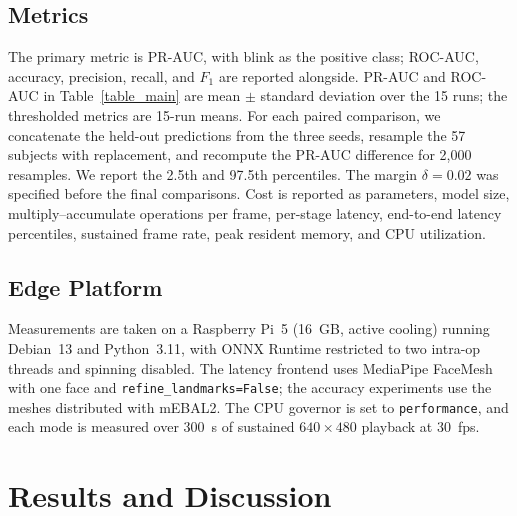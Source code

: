 \documentclass{IEEE_lsens}
\begin{document}
\subsection{Metrics}
The primary metric is PR-AUC, with blink as the positive class;
ROC-AUC, accuracy, precision, recall, and $F_1$ are reported alongside.
PR-AUC and ROC-AUC in Table~\ref{table_main} are mean $\pm$ standard
deviation over the 15 runs; the thresholded metrics are 15-run means.
For each paired comparison, we concatenate the held-out predictions
from the three seeds, resample the 57 subjects with replacement, and
recompute the PR-AUC difference for 2,000 resamples. We report the 2.5th
and 97.5th percentiles. The margin $\delta=0.02$ was specified before
the final comparisons. Cost is reported as parameters, model size,
multiply--accumulate operations per frame, per-stage latency,
end-to-end latency percentiles, sustained frame rate, peak resident
memory, and CPU utilization.

\subsection{Edge Platform}
Measurements are taken on a Raspberry Pi~5 (16~GB, active cooling)
running Debian~13 and Python~3.11, with ONNX Runtime restricted to two
intra-op threads and spinning disabled. The latency frontend uses
MediaPipe FaceMesh with one face and \texttt{refine\_landmarks=False};
the accuracy experiments use the meshes distributed with mEBAL2. The
CPU governor is set to \texttt{performance}, and each mode is measured
over 300~s of sustained $640\times480$ playback at 30~fps.

\section{Results and Discussion}
\end{document}
